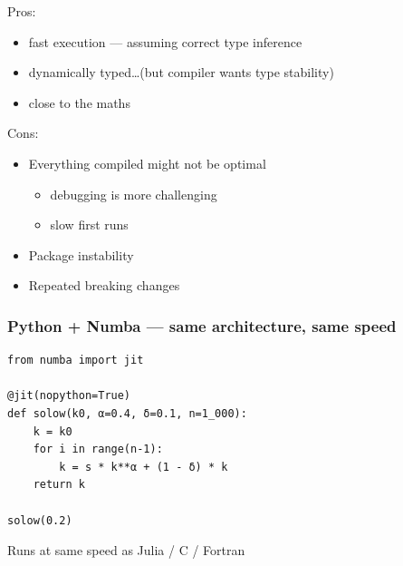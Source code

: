 \begin{frame}
    
    Pros:

    \begin{itemize}
        \item fast execution --- assuming correct type inference
        \vspace{0.2em}
        \item dynamically typed\ldots (but compiler wants type stability)
        \vspace{0.2em}
        \item close to the maths
    \end{itemize}

        \vspace{0.2em}
        \vspace{0.2em}
        \vspace{0.2em}
        \vspace{0.2em}
        \vspace{0.2em}
        \vspace{0.2em}
    Cons:

    \begin{itemize}
        \item Everything compiled might not be optimal 
        \vspace{0.2em}
        \begin{itemize}
            \item debugging is more challenging
            \vspace{0.2em}
            \item slow first runs
            \vspace{0.2em}
        \end{itemize}
        \item Package instability
        \vspace{0.2em}
        \item Repeated breaking changes
    \end{itemize}

\end{frame}

\begin{frame}[fragile]
    \frametitle{Python + Numba --- same architecture, same speed}
    
    \begin{verbatim}
from numba import jit

@jit(nopython=True)
def solow(k0, α=0.4, δ=0.1, n=1_000):
    k = k0
    for i in range(n-1):
        k = s * k**α + (1 - δ) * k
    return k

solow(0.2)
    \end{verbatim}


    Runs at same speed as Julia / C / Fortran

\end{frame}


